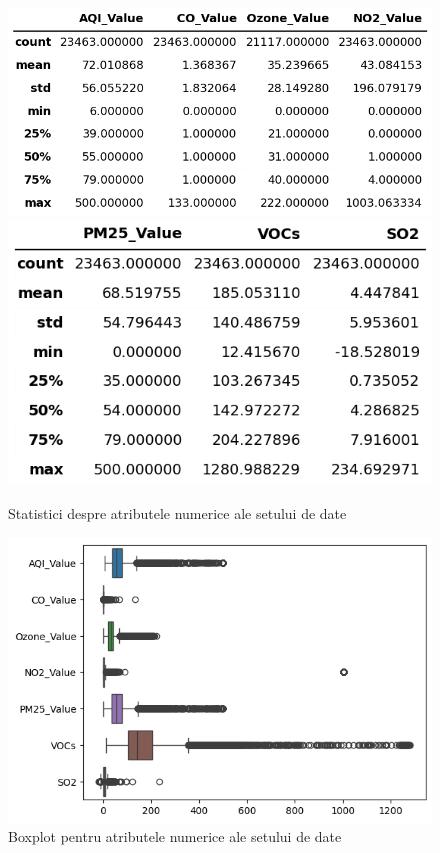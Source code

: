 \documentclass{article}
\begin{document}
\begin{figure}[htb]
    \centering
    \includegraphics[scale=0.55]{air_pollution/analysis/numeric/table1.png}
    \includegraphics[scale=0.55]{air_pollution/analysis/numeric/table2.png}
    
    \caption{Statistici despre atributele numerice ale setului de date}
    \label{fig:pol:num_attr}
\end{figure}

\begin{figure}[htb]
    \centering
    \includegraphics[scale=0.7]{air_pollution/analysis/numeric/boxplot.png}
    \caption{Boxplot pentru atributele numerice ale setului de date}
    \label{fig:pol:num_boxplot}
\end{figure}
\end{document}
